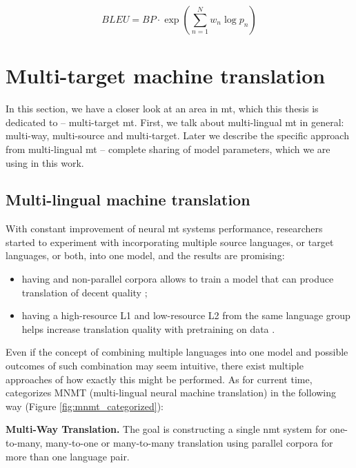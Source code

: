 \begin{equation}
\label{eq:bleu}
	BLEU=BP \cdot \exp \left(\sum_{n=1}^{N} w_n \log p_n \right)
\end{equation}


\section{Multi-target machine translation}
\label{section:multitarget_mt}

In this section, we have a closer look at an area in \acrshort{mt},
which this thesis is dedicated to -- multi-target \acrshort{mt}.
First, we talk about multi-lingual \acrshort{mt} in general: multi-way,
multi-source and multi-target.
Later we describe the specific approach from multi-lingual \acrshort{mt}
-- complete sharing of model parameters, which we are using in this work.


\subsection{Multi-lingual machine translation}

With constant improvement of neural \acrshort{mt} systems performance,
researchers started to experiment with incorporating multiple source
languages, or target languages, or both, into one model,
and the results are promising:
\begin{itemize}
	\item having  and  non-parallel
	corpora allows to train a model that can produce  translation
	of decent quality ;
	\item having a high-resource L1 and low-resource L2
	from the same language group helps increase  translation
	quality with pretraining on  data .
\end{itemize}

Even if the concept of combining multiple languages into one model and possible outcomes
of such combination may seem intuitive, there exist multiple approaches of how exactly
this might be performed. As for current time, \cite{Dabre2019} categorizes
MNMT (multi-lingual neural machine translation) in the following way
(Figure \ref{fig:mnmt_categorized}):

\textbf{Multi-Way Translation.}
The goal is constructing a single \acrshort{nmt} system for
one-to-many, many-to-one or many-to-many
translation using parallel corpora for more than one language pair.

